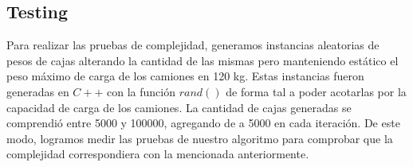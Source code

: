 \subsection{Testing}
Para realizar las pruebas de complejidad, generamos instancias aleatorias de pesos de cajas alterando la cantidad de las mismas pero manteniendo estático el peso máximo de carga de los camiones en 120 \unit{kg}. Estas instancias fueron generadas en $C++$ con la función $rand()$ de forma tal a poder acotarlas por la capacidad de carga de los camiones. La cantidad de cajas generadas se comprendió entre 5000 y 100000, agregando de a 5000 en cada iteración. De este modo, logramos medir las pruebas de nuestro algoritmo para comprobar que la complejidad correspondiera con la mencionada anteriormente.

